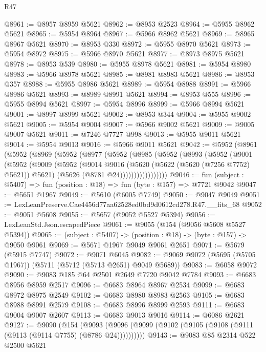 \begin{lexlean}{R47}
\begin{coremodule}
@8961 := @8957 @8959 @5621
@8962 := @8953 @2523
@8964 := @5955 @8962 @5621
@8965 := @5954 @8964
@8967 := @5966 @8962 @5621
@8969 := @8965 @8967 @5621
@8970 := @8953 @330
@8972 := @5955 @8970 @5621
@8973 := @5954 @8972
@8975 := @5966 @8970 @5621
@8977 := @8973 @8975 @5621
@8978 := @8953 @539
@8980 := @5955 @8978 @5621
@8981 := @5954 @8980
@8983 := @5966 @8978 @5621
@8985 := @8981 @8983 @5621
@8986 := @8953 @357
@8988 := @5955 @8986 @5621
@8989 := @5954 @8988
@8991 := @5966 @8986 @5621
@8993 := @8989 @8991 @5621
@8994 := @8953 @555
@8996 := @5955 @8994 @5621
@8997 := @5954 @8996
@8999 := @5966 @8994 @5621
@9001 := @8997 @8999 @5621
@9002 := @8953 @344
@9004 := @5955 @9002 @5621
@9005 := @5954 @9004
@9007 := @5966 @9002 @5621
@9009 := @9005 @9007 @5621
@9011 := @7246 @7727 @998
@9013 := @5955 @9011 @5621
@9014 := @5954 @9013
@9016 := @5966 @9011 @5621
@9042 := @5952
    (@8961
      (@5952
        (@8969
          (@5952
            (@8977
              (@5952
                (@8985
                  (@5952
                    (@8993
                      (@5952
                        (@9001
                          (@5952
                            (@9009
                              (@5952
                                (@9014
                                  @9016
                                  (@5620 (@5622 (@5620 (@7256 @7752) @5621)) @5621)
                                  (@5626 (@8781 @24)))))))))))))))))
@9046 := fun (subject : @5407) => fun (position : @18) => fun (byte : @157) => @7721 @9042
@9047 := @5651 @1967
@9049 := @5610 (@6005 @7749)
@9050 := @9047 @9049
@9051 := LexLeanPreserve.Cae4456d77aa62528ed0bd9d0612cd278.R47.__fits_68
@9052 := @9051 @5608
@9055 := @5657 (@9052 @5527 @5394)
@9056 := LexLeanStd.Json.escapedPiece
@9061 := @9055 (@154 (@9056 @5608 @5527 @5394))
@9065 := (subject : @5407) -> (position : @18) -> (byte : @157) -> @9050 @9061
@9069 := @5671 @1967 @9049 @9061 @2651
@9071 := @5679 (@5915 @7747)
@9072 := @9071 @6045
@9082 := @9069 @9072 (@5695 (@5705 @1967)) (@5711 (@5712 (@5713 @2651) @9049 @5689))
@9083 := @6058 @9072
@9090 := @9083 @185 @64 @2501 @2649 @7720 @9042 @7784
@9093 := @6683 @8956 @8959 @2517
@9096 := @6683 @8964 @8967 @2534
@9099 := @6683 @8972 @8975 @2549
@9102 := @6683 @8980 @8983 @2563
@9105 := @6683 @8988 @8991 @2579
@9108 := @6683 @8996 @8999 @2593
@9111 := @6683 @9004 @9007 @2607
@9113 := @6683 @9013 @9016
@9114 := @6086 @2621
@9127 := @9090
    (@154 (@9093 (@9096 (@9099 (@9102 (@9105 (@9108 (@9111 (@9113 (@9114 @7755) (@8786 @24))))))))))
@9143 := @9083
    @85
    @2314
    @522
    @2500
    @5621

\end{coremodule}
\end{lexlean}
